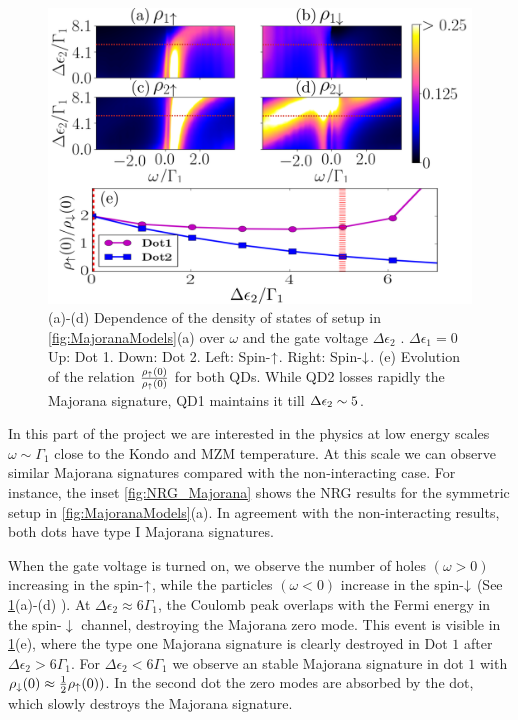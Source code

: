 \begin{figure}[H]
    \centering
    \includegraphics[scale=0.5]{IMAGES/NRG/FullEd2.png}
    \caption{\label{fig:ed2/Fermi} (a)-(d) Dependence of the density of states of setup in \ref{fig:MajoranaModels}(a) over $\omega$ and the gate voltage $\Delta \epsilon_2$ . $\Delta \epsilon_1=0$  Up: Dot 1. Down: Dot 2. Left: Spin-$\uparrow$. Right: Spin-$\downarrow$.  (e) Evolution of the relation $\frac{\rho_\uparrow(0)}{\rho_\uparrow(0)}$ for both QDs. While QD2 losses rapidly the Majorana signature, QD1 maintains it till $\Delta \epsilon_{2}\sim 5$. \protect\Source{}}
\end{figure}



    In this part of the project we are interested in the physics at low energy scales $\omega \sim \Gamma_1 $ close to the Kondo and MZM temperature. At this scale we can observe similar Majorana signatures compared with the non-interacting case. For instance, the inset \ref{fig:NRG_Majorana} shows the NRG results for the symmetric setup in \ref{fig:MajoranaModels}(a). In agreement with the non-interacting results, both dots have type I Majorana signatures. 

    When the gate voltage is turned on, we observe the number of holes $(\omega>0)$ increasing in the spin-$\uparrow$, while the particles $(\omega<0)$ increase in the spin-$\downarrow$ (See \ref{fig:ed2/Fermi}(a)-(d) ). At $\Delta\epsilon_2 \approx 6\Gamma_1$, the Coulomb peak overlaps with the Fermi energy in the spin-$\downarrow$ channel, destroying the Majorana zero mode. This event is visible in \ref{fig:ed2/Fermi}(e), where the type one Majorana signature is clearly destroyed in Dot $1$ after $\Delta\epsilon_2 > 6\Gamma_1$. For $\Delta\epsilon_2 < 6\Gamma_1$ we observe an stable Majorana signature in dot $1$ with $\rho_\downarrow(0) \approx \frac{1}{2}\rho_\uparrow(0))$. In the second dot the zero modes are absorbed by the dot, which slowly destroys the Majorana signature. 

